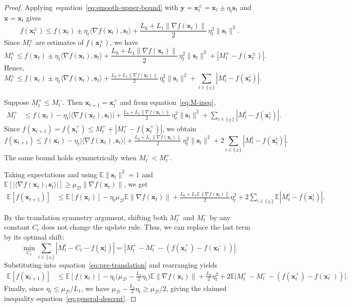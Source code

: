 \documentclass[twoside]{article}
\theoremstyle{plain}
\theoremstyle{definition}
\theoremstyle{remark}
\def\eqref#1{equation~\ref{#1}}
\def\cD{{\mathcal{D}}}
\def\vs{{\bm{s}}}
\def\vx{{\bm{x}}}
\def\vy{{\bm{y}}}
\newcommand{\E}{\mathbb{E}}
\begin{document}
\begin{proof}
Applying~\eqref{eq:smooth-upper-bound} with
$\vy = \vx_t^\pm = \vx_t \pm \eta_t \vs_t$ and $\vx = \vx_t$ gives
\begin{equation*}
    f(\vx_t^{\pm})
    \le
    f(\vx_t)
    \pm \eta_t \langle \nabla f(\vx_t), \vs_t\rangle
    + \frac{L_0 + L_1 \|\nabla f(\vx_t)\|}{2}\,\eta_t^2 \|\vs_t\|^2.
\end{equation*}
Since $M_t^\pm$ are estimates of $f(\vx_t^\pm)$, we have
\begin{equation*}
    M_t^\pm
    \le
    f(\vx_t)
    \pm \eta_t \langle \nabla f(\vx_t), \vs_t\rangle
    + \frac{L_0 + L_1 \|\nabla f(\vx_t)\|}{2}\,\eta_t^2\|\vs_t\|^2
    + |M_t^\pm - f(\vx_t^\pm)|.
\end{equation*}
Hence,
\begin{equation}
\label{eq:M-ineq}
    M_t^\pm
    \le
    f(\vx_t)
    \pm \eta_t \langle \nabla f(\vx_t), \vs_t\rangle
    + \tfrac{L_0 + L_1 \|\nabla f(\vx_t)\|}{2}\,\eta_t^2\|\vs_t\|^2
    + \sum_{i\in\{\pm\}} |M_t^i - f(\vx_t^i)|.
\end{equation}

Suppose $M_t^+ \le M_t^-$. Then $\vx_{t+1}=\vx_t^+$ and from
\eqref{eq:M-ineq},
\begin{align*}
    M_t^+
    &\le
    f(\vx_t)
    - \eta_t |\langle \nabla f(\vx_t), \vs_t\rangle|
    + \tfrac{L_0 + L_1 \|\nabla f(\vx_t)\|}{2}\,\eta_t^2\|\vs_t\|^2
    + \sum_{i\in\{\pm\}} |M_t^i - f(\vx_t^i)|.
\end{align*}
Since $f(\vx_{t+1}) = f(\vx_t^+)\le M_t^+ + |M_t^+ - f(\vx_t^+)|$, we obtain
\[
    f(\vx_{t+1})
    \le
    f(\vx_t)
    - \eta_t |\langle \nabla f(\vx_t), \vs_t\rangle|
    + \tfrac{L_0 + L_1 \|\nabla f(\vx_t)\|}{2}\,\eta_t^2\|\vs_t\|^2
    + 2 \sum_{i\in\{\pm\}} |M_t^i - f(\vx_t^i)|.
\]
The same bound holds symmetrically when $M_t^- < M_t^+$.

Taking expectations and using $\E\|\vs_t\|^2=1$ and
$\E[|\langle\nabla f(\vx_t),\vs_t\rangle|]\ge \mu_{\cD}\|\nabla f(\vx_t)\|$,
we get
\begin{align}
\E[f(\vx_{t+1})]
&\le
\E[f(\vx_t)]
- \eta_t \mu_{\cD}\E\|\nabla f(\vx_t)\|
+ \tfrac{L_0 + L_1\E\|\nabla f(\vx_t)\|}{2}\eta_t^2
+ 2\sum_{i\in\{\pm\}}\E|M_t^i - f(\vx_t^i)|.
\label{eq:pre-translation}
\end{align}

By the translation symmetry argument, shifting both $M_t^+$ and $M_t^-$ by any
constant $C_t$ does not change the update rule. Thus, we can replace the last
term by its optimal shift:
\[
    \min_{C_t}
    \sum_{i\in\{\pm\}} |M_t^i - C_t - f(\vx_t^i)|
    = |M_t^+ - M_t^- - (f(\vx_t^+) - f(\vx_t^-))|.
\]
Substituting into~\eqref{eq:pre-translation} and rearranging yields
\begin{align*}
\E[f(\vx_{t+1})]
&\le
\E[f(\vx_t)]
- \eta_t\big(\mu_{\cD} - \tfrac{L_1}{2}\eta_t\big)\E\|\nabla f(\vx_t)\|
+ \tfrac{L_0}{2}\eta_t^2
+ 2\E\big|M_t^+ - M_t^- - (f(\vx_t^+) - f(\vx_t^-))\big|.
\end{align*}
Finally, since $\eta_t\le\mu_{\cD}/L_1$, we have
$\mu_{\cD}-\tfrac{L_1}{2}\eta_t\ge \mu_{\cD}/2$, giving the claimed inequality
\eqref{eq:general-descent}.
\end{proof}
\end{document}
